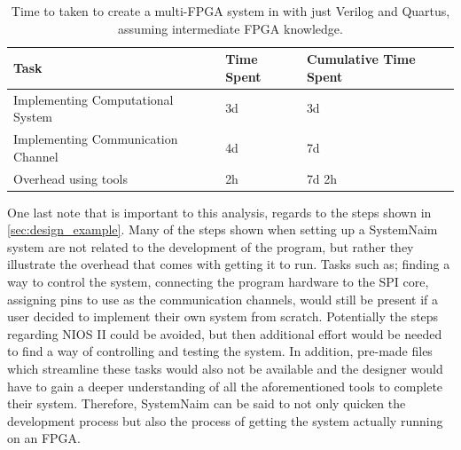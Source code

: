 \begin{table}[]
\begin{tabular}{l|l|l}
Task                               & Time Spent & Cumulative Time Spent \\ \hline
Implementing Computational System  & 3d         & 3d                    \\
Implementing Communication Channel & 4d         & 7d                    \\
Overhead using tools               & 2h         & 7d 2h                
\end{tabular}
\caption{Time to taken to create a multi-FPGA system in with just Verilog and Quartus, assuming intermediate FPGA knowledge.}
\label{tbl:time_custom}
\end{table}


One last note that is important to this analysis, regards to the steps shown in \autoref{sec:design_example}. Many of the steps shown when setting up a SystemNaim system are not related to the development of the program, but rather they illustrate the overhead that comes with getting it to run. Tasks such as; finding a way to control the system, connecting the program hardware to the SPI core, assigning pins to use as the communication channels, would still be present if a user decided to implement their own system from scratch. Potentially the steps regarding NIOS II could be avoided, but then additional effort would be needed to find a way of controlling and testing the system. In addition, pre-made files which streamline these tasks would also not be available and the designer would have to gain a deeper understanding of all the aforementioned tools to complete their system. Therefore, SystemNaim can be said to not only quicken the development process but also the process of getting the system actually running on an FPGA.







